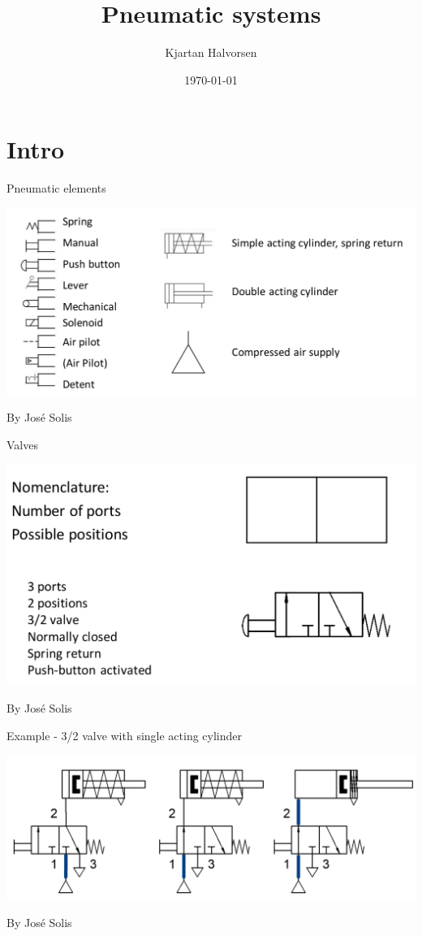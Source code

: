 \documentclass[presentation,aspectratio=1610]{beamer}
\author{Kjartan Halvorsen}
\date{\today}
\title{Pneumatic systems}
\begin{document}
\maketitle

\section{Intro}
\label{sec:orgd4018e1}
\begin{frame}[label={sec:orgd4c9f5e}]{Pneumatic elements}
\begin{center}
\includegraphics[width=\linewidth]{../../figures/actuation-symbols.png}
\end{center}
{\tiny By José Solis}
\end{frame}
\begin{frame}[label={sec:org3deb9b9}]{Valves}
\begin{center}
\includegraphics[width=\linewidth]{../../figures/valves-32.png}
\end{center}
{\tiny By José Solis}
\end{frame}
\begin{frame}[label={sec:org015d018}]{Example - 3/2 valve with single acting cylinder}
\begin{center}
\includegraphics[width=\linewidth]{../../figures/valve-32-example.png}
\end{center}
{\tiny By José Solis}
\end{frame}
\end{document}
